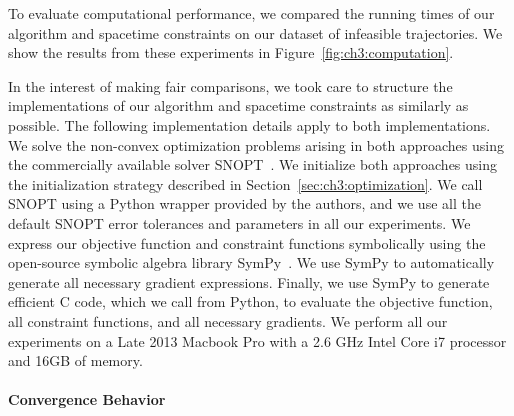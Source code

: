 To evaluate computational performance, we compared the running times of our algorithm and spacetime constraints on our dataset of infeasible trajectories.
We show the results from these experiments in Figure~\ref{fig:ch3:computation}.

In the interest of making fair comparisons, we took care to structure the implementations of our algorithm and spacetime constraints as similarly as possible.
The following implementation details apply to both implementations.
We solve the non-convex optimization problems arising in both approaches using the commercially available solver SNOPT~\cite{gill:2002}.
We initialize both approaches using the initialization strategy described in Section~\ref{sec:ch3:optimization}.
We call SNOPT using a Python wrapper provided by the authors, and we use all the default SNOPT error tolerances and parameters in all our experiments.
We express our objective function and constraint functions symbolically using the open-source symbolic algebra library SymPy~\cite{sympy:2014}.
We use SymPy to automatically generate all necessary gradient expressions. Finally, we use SymPy to generate efficient C code, which we call from Python, to evaluate the objective function, all constraint functions, and all necessary gradients.
We perform all our experiments on a Late 2013 Macbook Pro with a 2.6 GHz Intel Core i7 processor and 16GB of memory.

\paragraph{Convergence Behavior}


